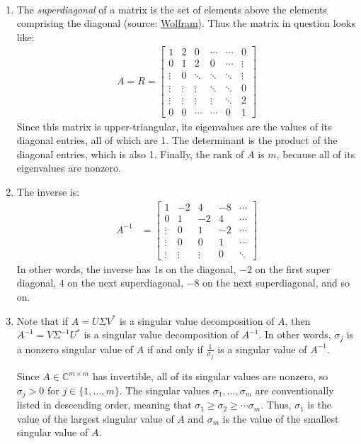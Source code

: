 \documentclass[12pt]{article}
\newenvironment{sol}[1][Solution]{\begin{trivlist}
		\item[\hskip \labelsep {\bfseries #1:}]}{\end{trivlist}}
\begin{document}
\begin{sol}
	\
	\begin{enumerate}[label=(\alph*)]
		\item The \emph{superdiagonal} of a matrix is the set of elements above the elements comprising the
		diagonal (source: \href{https://mathworld.wolfram.com/Superdiagonal.html}{Wolfram}). Thus
		the matrix in question looks like:
		\begin{align*}
			A=R=\begin{bmatrix}
				1 & 2 & 0 & \cdots & \cdots & 0\\
				0 & 1 & 2 & 0 & \cdots & \vdots\\
				\vdots & 0 & \ddots& \ddots & \ddots & \vdots\\
				\vdots& \vdots & \vdots & \ddots & \ddots& 0\\
				\vdots & \vdots & \vdots & \vdots& \ddots & 2\\
				0 & 0 & \cdots & \cdots & 0 & 1
			\end{bmatrix}
		\end{align*}
		Since this matrix is upper-triangular, its eigenvalues are the values of its diagonal entries,
		all of which are 1. The determinant is the product of the diagonal entries, which is also 1.
		Finally, the rank of $A$ is $m$, because all of its eigenvalues are nonzero.
		\item The inverse is:
		\begin{align*}
			A^{-1}&=\begin{bmatrix}
				1 & -2 & 4& -8 & \cdots\\
				0 & 1 & -2& 4 & \cdots \\
				\vdots & 0 & 1 & -2 &\cdots\\
				\vdots & 0 & 0 & 1 & \cdots\\
				\vdots & \vdots &\vdots & 0 & \ddots
			\end{bmatrix}
		\end{align*}
		In other words, the inverse has 1s on the diagonal, $-2$ on the first super diagonal, $4$ on the next
		superdiagonal, $-8$ on the next superdiagonal, and so on.
		\item Note that if $A=U\Sigma V^*$ is a singular value decomposition of $A$, then
		$A^{-1}=V\Sigma^{-1}U^*$ is a singular value decomposition of $A^{-1}$. In other words,
		$\sigma_j$ is a nonzero singular value of $A$ if and only if $\frac{1}{\sigma_j}$ is a singular value
		of $A^{-1}$.
		
		Since $A\in\mathbb{C}^{m\times m}$ has invertible, all of its singular values are nonzero, so
		$\sigma_j>0$ for $j\in\{1,\ldots,m\}$. The singular values $\sigma_1,\ldots,\sigma_m$ are
		conventionally listed in descending order, meaning that $\sigma_1\geq \sigma_2\geq \cdots\sigma_m$.
		Thus, $\sigma_1$ is the value of the largest singular value  of $A$ and $\sigma_m$ is the value
		of the smallest singular value of $A$.
		

\end{enumerate}
\end{sol}
\end{document}

